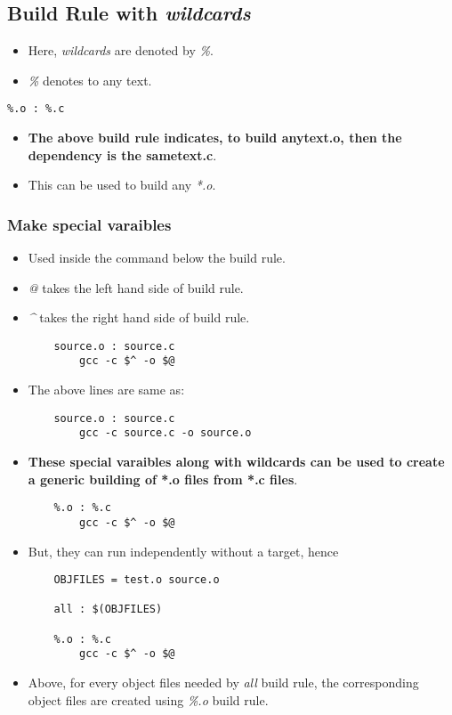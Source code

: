 \documentclass{article}
\begin{document}
\subsection{Build Rule with \emph{wildcards}}
\begin{itemize}
    \item Here, \emph{wildcards} are denoted by \emph{\%}.
    \item \emph{\%} denotes to any text.
\end{itemize}
\begin{verbatim}
%.o : %.c
\end{verbatim}
\begin{itemize}
    \item \textbf{The above build rule indicates, to build anytext.o, then the dependency is the sametext.c}.
    \item This can be used to build any \emph{*.o}.
\end{itemize}



\subsubsection{Make special varaibles}
\begin{itemize}
    \item Used inside the command below the build rule.
    \item \emph{@} takes the left hand side of build rule.
    \item \emph{\^} takes the right hand side of build rule.
          \begin{verbatim}
    source.o : source.c
        gcc -c $^ -o $@
    \end{verbatim}
    \item The above lines are same as:
          \begin{verbatim}
    source.o : source.c
        gcc -c source.c -o source.o
    \end{verbatim}
    \item \textbf{These special varaibles along with wildcards can be used to create a generic building of *.o files from *.c files}.
          \begin{verbatim}
    %.o : %.c
        gcc -c $^ -o $@
    \end{verbatim}
    \item But, they can run independently without a target, hence
          \begin{verbatim}
    OBJFILES = test.o source.o

    all : $(OBJFILES)
    
    %.o : %.c
        gcc -c $^ -o $@
    \end{verbatim}
    \item Above, for every object files needed by \emph{all} build rule, the corresponding object files are created using \emph{\%.o} build rule.
\end{itemize}
\end{document}
